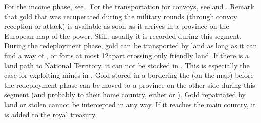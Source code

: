  For the income phase, see
.
\bparag For the transportation for convoys, see
 and .
\bparag Remark that gold that was recuperated during the military rounds
(through convoy reception or attack) is available as soon as it arrives in a
province on the European map of the power. Still, usually it is recorded
during this segment.
\label{chRedep:GoldTransportation} During the
redeployment phase, gold can be transported by land as long as it can find a
way of \TP, \COL or forts at most 12\MP apart crossing only friendly land. If
there is a land path to National Territory, it can not be stocked in \ROTW.
\bparag This is especially the case for \RUS exploiting mines in
.
\bparag Gold stored in a \COL bordering the  (on the \ROTW
map) before the redeployment phase can be moved to a province on the other
side during this segment (and probably to their home country, either \POL or
\TUR).
\bparag Gold repatriated by land or stolen cannot be intercepted in any
way. If it reaches the main country, it is added to the royal treasury.



